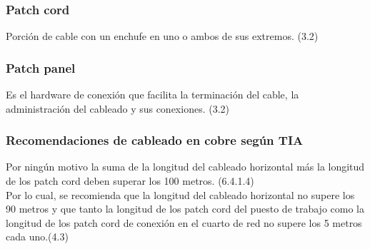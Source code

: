 

\subsubsection{Patch cord}

Porción de cable con un enchufe en uno o ambos de sus extremos. (3.2) \cite{TIA}


\subsubsection{Patch panel}

Es el hardware de conexión que facilita la terminación del cable, la administración del cableado y sus conexiones. (3.2) \cite{TIA}



\subsubsection{Recomendaciones de cableado en cobre según TIA}

Por ningún motivo la suma de la longitud del cableado horizontal más la longitud de los patch cord deben superar los 100 metros. (6.4.1.4) \cite{TIA}\\

Por lo cual, se recomienda que la longitud del cableado horizontal no supere los 90 metros y que tanto la longitud de los patch cord del puesto de trabajo como la longitud de los patch cord de conexión en el cuarto de red no supere los 5 metros cada uno.(4.3) \cite{TIA}


















